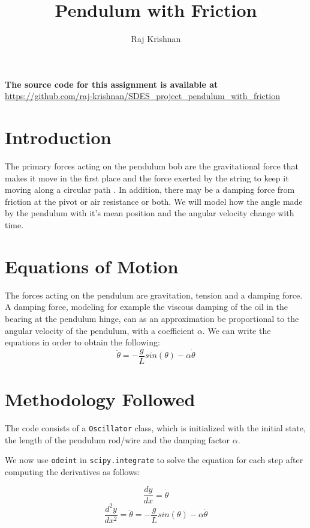\documentclass[12pt,english]{article}
\title{Pendulum with Friction}
\author{Raj Krishnan}
\begin{document}
\maketitle

\textbf{The source code for this assignment is available at } \url{https://github.com/raj-krishnan/SDES_project_pendulum_with_friction}

\section{Introduction}
  The primary forces acting on the pendulum bob are the gravitational force 
  that makes it move in the first place and the force exerted by the string
  to keep it moving along a circular path \cite{surrow}. In addition, there may be a 
  damping force from friction at the pivot or air resistance or both. We 
  will model how the angle made by the pendulum with it's mean position and
  the angular velocity change with time.

\section{Equations of Motion}
  
  The forces acting on the pendulum are gravitation, tension and a damping
  force. A damping force, modeling for example the viscous damping of the 
  oil in the bearing at the pendulum hinge, can as an approximation be 
  proportional to the angular velocity of the pendulum, with a coefficient 
  $\alpha$. We can write the equations \cite{james} in order to obtain the 
  following:
  \begin{equation}
          \label{eq:eom}
          \ddot{\theta} = -\frac{g}{L}sin(\theta) - \alpha \dot{\theta}                    
  \end{equation}

\section{Methodology Followed}

  The code consists of a \texttt{Oscillator} class, which is initialized with 
  the initial state, the length of the pendulum rod/wire and the damping factor
  $\alpha$. 

  We now use \texttt{odeint} in \texttt{scipy.integrate} to solve the equation 
  for each step after computing the derivatives as follows:
   
  $$\frac{dy}{dx} = \dot{\theta}$$
  $$\frac{d^2y}{dx^2} = \ddot{\theta} 
                      = -\frac{g}{L}sin(\theta) - \alpha \dot{\theta}$$
\end{document}
